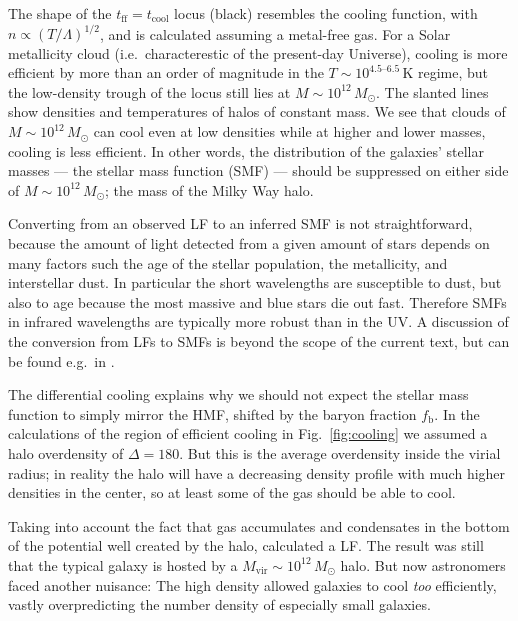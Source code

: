 \documentclass[useAMS,usenatbib,bibyear]{aa}
\begin{document}
The shape of the $t_\mathrm{ff} = t_\mathrm{cool}$ locus (black) resembles the cooling function, with $n\propto (T/\Lambda)^{1/2}$, and is calculated assuming a metal-free gas. For a Solar metallicity cloud (i.e.~characterestic of the present-day Universe), cooling is more efficient by more than an order of magnitude in the $T \sim 10^{4.5\text{--}6.5}\,\mathrm{K}$ regime, but the low-density trough of the locus still lies at $M\sim10^{12}\,M_\odot$.
The slanted lines show densities and temperatures of halos of constant mass. We see that clouds of $M\sim10^{12}\,M_\odot$ can cool even at low densities while at higher and lower masses, cooling is less efficient.
In other words, the distribution of the galaxies' stellar masses --- the stellar mass function (SMF) --- should be suppressed on either side of $M\sim10^{12}\,M_\odot$; the mass of the Milky Way halo.

Converting from an observed LF to an inferred SMF is not straightforward, because the amount of light detected from a given amount of stars depends on many factors such the age of the stellar population, the metallicity, and interstellar dust.
In particular the short wavelengths are susceptible to dust, but also to age because the most massive and blue stars die out fast.
Therefore SMFs in infrared wavelengths are typically more robust than in the UV.
A discussion of the conversion from LFs to SMFs is beyond the scope of the current text, but can be found e.g.~in \citet{Song2016}.

The differential cooling explains why we should not expect the stellar mass function to simply mirror the HMF, shifted by the baryon fraction $f_\mathrm{b}$.
In the calculations of the region of efficient cooling in Fig.~\ref{fig:cooling} we assumed a halo overdensity of $\Delta=180$.
But this is the average overdensity inside the virial radius;
in reality the halo will have a decreasing density profile with much higher densities in the center, so at least some of the gas should be able to cool.

Taking into account the fact that gas accumulates and condensates in the bottom of the potential well created by the halo, \citet{White1978} calculated a LF.
The result was still that the typical galaxy is hosted by a $M_\mathrm{vir}\sim10^{12}\,M_\odot$ halo.
But now astronomers faced another nuisance:
The high density allowed galaxies to cool \emph{too} efficiently, vastly overpredicting the number density of especially small galaxies.
\end{document}
